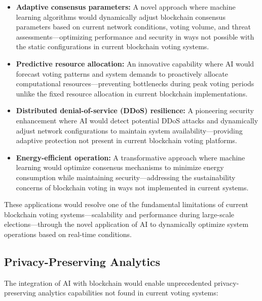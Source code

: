 \documentclass[conference]{IEEEtran}
\begin{document}
\begin{itemize}
    \item \textbf{Adaptive consensus parameters:} A novel approach where machine learning algorithms would dynamically adjust blockchain consensus parameters based on current network conditions, voting volume, and threat assessments—optimizing performance and security in ways not possible with the static configurations in current blockchain voting systems.
    
    \item \textbf{Predictive resource allocation:} An innovative capability where AI would forecast voting patterns and system demands to proactively allocate computational resources—preventing bottlenecks during peak voting periods unlike the fixed resource allocation in current blockchain implementations.
    
    \item \textbf{Distributed denial-of-service (DDoS) resilience:} A pioneering security enhancement where AI would detect potential DDoS attacks and dynamically adjust network configurations to maintain system availability—providing adaptive protection not present in current blockchain voting platforms.
    
    \item \textbf{Energy-efficient operation:} A transformative approach where machine learning would optimize consensus mechanisms to minimize energy consumption while maintaining security—addressing the sustainability concerns of blockchain voting in ways not implemented in current systems.
\end{itemize}

These applications would resolve one of the fundamental limitations of current blockchain voting systems—scalability and performance during large-scale elections—through the novel application of AI to dynamically optimize system operations based on real-time conditions.

\subsection{Privacy-Preserving Analytics}
The integration of AI with blockchain would enable unprecedented privacy-preserving analytics capabilities not found in current voting systems:
\end{document}
